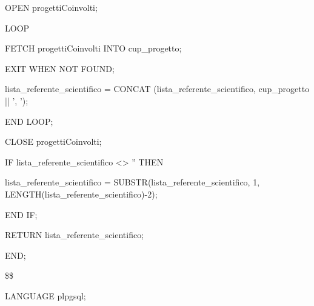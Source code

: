 \begin{flushleft}
\begin{description}
\begin{description}
                                \item OPEN progettiCoinvolti;
                                \item LOOP
                                \begin{description}
                                    \item FETCH progettiCoinvolti INTO cup\_progetto;
                                    \item EXIT WHEN NOT FOUND;
                                    \item lista\_referente\_scientifico = CONCAT (lista\_referente\_scientifico, cup\_progetto || ', ');
                                \end{description}
                                \item END LOOP;
                                \item CLOSE progettiCoinvolti;
                                \item IF lista\_referente\_scientifico <> '' THEN
                                \begin{description}
                                    \item lista\_referente\_scientifico = SUBSTR(lista\_referente\_scientifico, 1, LENGTH(lista\_referente\_scientifico)-2);
                                \end{description}
                                \item END IF;
                                \item RETURN lista\_referente\_scientifico;
                            \end{description}
                        \item END;
                        \item \$\$
                        \item LANGUAGE plpgsql;
                    \end{description}
                \end{flushleft}
            \normalfont




